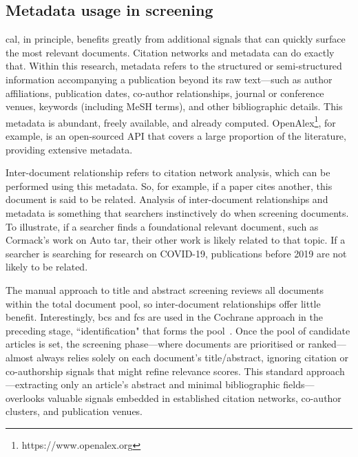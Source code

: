 \documentclass[10pt,oneside]{book}
\begin{document}
\subsection{Metadata usage in screening}

\gls*{cal}, in principle, benefits greatly from additional signals that can quickly surface the most relevant documents. Citation networks and metadata can do exactly that. Within this research, metadata refers to the structured or semi-structured information accompanying a publication beyond its raw text—such as author affiliations, publication dates, co-author relationships, journal or conference venues, keywords (including MeSH terms), and other bibliographic details. This metadata is abundant, freely available, and already computed. OpenAlex\footnote{https://www.openalex.org}, for example, is an open-sourced API that covers a large proportion of the literature, providing extensive metadata.

Inter-document relationship refers to citation network analysis, which can be performed using this metadata. So, for example, if a paper cites another, this document is said to be related. Analysis of inter-document relationships and metadata is something that searchers instinctively do when screening documents. To illustrate, if a searcher finds a foundational relevant document, such as Cormack's work on Auto \gls*{tar}, their other work is likely related to that topic. If a searcher is searching for research on COVID-19, publications before 2019 are not likely to be related. 

The manual approach to title and abstract screening reviews all documents within the total document pool, so inter-document relationships offer little benefit. Interestingly, \gls*{bcs} and \gls*{fcs} are used in the Cochrane approach in the preceding stage, ``identification" that forms the pool~\cite{briscoe_conduct_2020, noauthor_mecir_nodate}. Once the pool of candidate articles is set, the screening phase—where documents are prioritised or ranked—almost always relies solely on each document’s title/abstract, ignoring citation or co-authorship signals that might refine relevance scores. This standard approach—extracting only an article’s abstract and minimal bibliographic fields—overlooks valuable signals embedded in established citation networks, co-author clusters, and publication venues.
\end{document}
